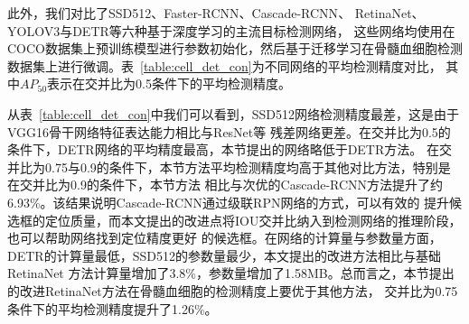 此外，我们对比了SSD512\cite{liu2016ssd}、Faster-RCNN\cite{ren2015faster}、Cascade-RCNN\cite{cai2018cascade}、
RetinaNet\cite{lin2017focal}、YOLOV3\cite{redmon2018yolov3}与DETR\cite{zhu2020deformable}等六种基于深度学习的主流目标检测网络，
这些网络均使用在COCO数据集上预训练模型进行参数初始化，然后基于迁移学习在骨髓血细胞检测数据集上进行微调。表~\ref{table:cell_det_con}为不同网络的平均检测精度对比，
其中$AP_{50}$表示在交并比为0.5条件下的平均检测精度。

从表~\ref{table:cell_det_con}中我们可以看到，SSD512网络检测精度最差，这是由于VGG16骨干网络特征表达能力相比与ResNet等
残差网络更差。在交并比为0.5的条件下，DETR网络的平均精度最高，本节提出的网络略低于DETR方法。
在交并比为0.75与0.9的条件下，本节方法平均检测精度均高于其他对比方法，特别是在交并比为0.9的条件下，本节方法 
相比与次优的Cascade-RCNN方法提升了约6.93\%。该结果说明Cascade-RCNN通过级联RPN网络的方式，可以有效的
提升候选框的定位质量，而本文提出的改进点将IOU交并比纳入到检测网络的推理阶段，也可以帮助网络找到定位精度更好
的候选框。在网络的计算量与参数量方面，DETR的计算量最低，SSD512的参数量最少，本文提出的改进方法相比与基础RetinaNet
方法计算量增加了3.8\%，参数量增加了1.58MB。总而言之，本节提出的改进RetinaNet方法在骨髓血细胞的检测精度上要优于其他方法，
交并比为0.75条件下的平均检测精度提升了1.26\%。

